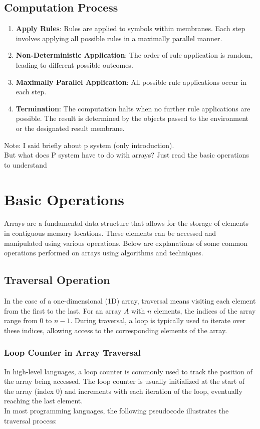\documentclass[12pt, oneside]{book}
\begin{document}
\subsection{Computation Process}

\begin{enumerate}
	\item \textbf{Apply Rules}: Rules are applied to symbols within membranes. Each step involves applying all possible rules in a maximally parallel manner.
	\item \textbf{Non-Deterministic Application}: The order of rule application is random, leading to different possible outcomes.
	\item \textbf{Maximally Parallel Application}: All possible rule applications occur in each step.
	\item \textbf{Termination}: The computation halts when no further rule applications are possible. The result is determined by the objects passed to the environment or the designated result membrane.
\end{enumerate}
Note: I said briefly about p system (only introduction).\\ But what does P system have to do with arrays? Just read the basic operations to understand
\section{Basic Operations}

Arrays are a fundamental data structure that allows for the storage of elements in contiguous memory locations. These elements can be accessed and manipulated using various operations. Below are explanations of some common operations performed on arrays using algorithms and techniques.

\subsection{Traversal Operation}

In the case of a one-dimensional (1D) array, traversal means visiting each element from the first to the last. For an array \( A \) with \( n \) elements, the indices of the array range from 0 to \( n - 1 \). During traversal, a loop is typically used to iterate over these indices, allowing access to the corresponding elements of the array.

\subsubsection{Loop Counter in Array Traversal} 
In high-level languages, a loop counter is commonly used to track the position of the array being accessed. The loop counter is usually initialized at the start of the array (index 0) and increments with each iteration of the loop, eventually reaching the last element.\\
In most programming languages, the following pseudocode illustrates the traversal process:
\end{document}
